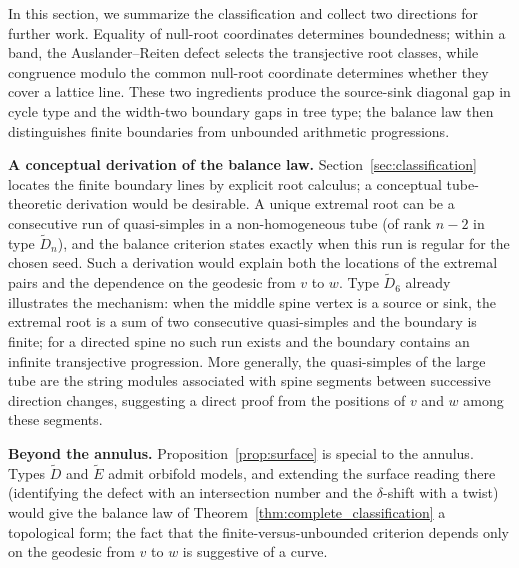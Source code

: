 \documentclass[11pt, a4paper]{amsart}
\theoremstyle{definition}
\begin{document}
In this section, we summarize the classification and collect two directions
for further work. Equality of null-root coordinates determines boundedness;
within a band, the Auslander--Reiten defect selects the transjective root
classes, while congruence modulo the common null-root coordinate determines
whether they cover a lattice line. These two ingredients produce the
source-sink diagonal gap in cycle type and the width-two boundary gaps in
tree type; the balance law then distinguishes finite boundaries from
unbounded arithmetic progressions.

\medskip\noindent\textbf{A conceptual derivation of the balance law.}\;
Section~\ref{sec:classification} locates the finite boundary lines by explicit
root calculus; a conceptual tube-theoretic derivation would be desirable. A
unique extremal root can be a consecutive run of quasi-simples in a
non-homogeneous tube (of rank $n-2$ in type $\widetilde D_n$), and the balance
criterion states exactly when this run is regular for the chosen seed. Such a
derivation would explain both the locations of the extremal pairs and the
dependence on the geodesic from $v$ to $w$. Type $\widetilde D_6$ already
illustrates the mechanism: when the middle spine vertex is a source or sink,
the extremal root is a sum of two consecutive quasi-simples and the boundary
is finite; for a directed spine no such run exists and the boundary contains
an infinite transjective progression. More generally, the quasi-simples of
the large tube are the string modules associated with spine segments between
successive direction changes, suggesting a direct proof from the positions of
$v$ and $w$ among these segments.

\medskip\noindent\textbf{Beyond the annulus.}\;
Proposition~\ref{prop:surface} is special to the annulus. Types
$\widetilde{D}$ and $\widetilde{E}$ admit orbifold models, and extending
the surface reading there (identifying the defect with an intersection
number and the $\delta$-shift with a twist) would give the balance law of
Theorem~\ref{thm:complete_classification} a topological form; the fact that
the finite-versus-unbounded criterion depends only on the geodesic from
$v$ to $w$ is suggestive of a curve.



\end{document}
